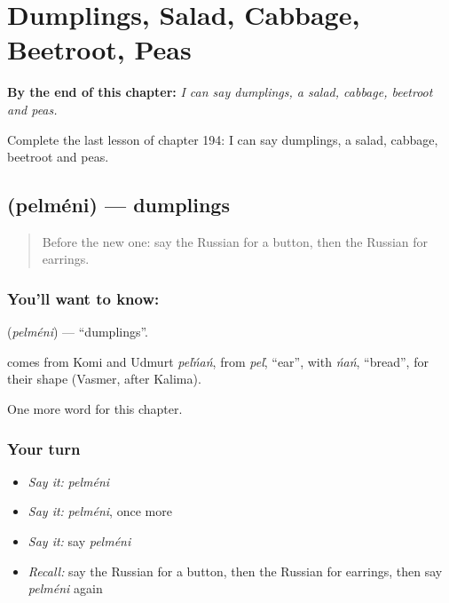 
\chapter{Dumplings, Salad, Cabbage, Beetroot, Peas}
\label{ch:ru-dumplings-salad-cabbage-beetroot-peas}

\begin{chapteropening}
\textbf{By the end of this chapter:} \emph{I can say dumplings, a salad, cabbage, beetroot and peas.}

Complete the last lesson of chapter 194: I can say dumplings, a salad, cabbage, beetroot and peas.
\end{chapteropening}

\section[\texorpdfstring{\ru{пельмени} (pelméni)}{пельмени (pelméni)}]{ (pelméni) — dumplings}

\label{lesson:RU-C194-pelmeni}



\begin{quote}
Before the new one: say the Russian for a button, then the Russian for earrings.
\end{quote}

\subsection*{You'll want to know: }
\textbf{} (\emph{pelméni}) — \textquotedblleft{}dumplings\textquotedblright{}.

\begin{cousinweb}
\textbf{} comes from Komi and Udmurt \emph{peľńań}, from \emph{peľ}, \textquotedblleft{}ear\textquotedblright{}, with \emph{ńań}, \textquotedblleft{}bread\textquotedblright{}, for their shape (Vasmer, after Kalima).
\end{cousinweb}

\begin{grammarlens}[title={What you've built}]
One more word for this chapter.
\end{grammarlens}

\subsection*{Your turn}
\begin{itemize}
\raggedright
  \item \emph{Say it:} \emph{pelméni}
  \item \emph{Say it:} \emph{pelméni}, once more
  \item \emph{Say it:} say \emph{pelméni}
  \item \emph{Recall:} say the Russian for a button, then the Russian for earrings, then say \emph{pelméni} again
\end{itemize}

